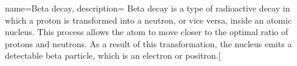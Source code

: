 {
    name=Beta decay,
    description={ Beta decay is a type of radioactive decay in which a proton is transformed into a neutron, or vice versa, inside an atomic nucleus. This process allows the atom to move closer to the optimal ratio of protons and neutrons. As a result of this transformation, the nucleus emits a detectable beta particle, which is an electron or positron.[
}
}
